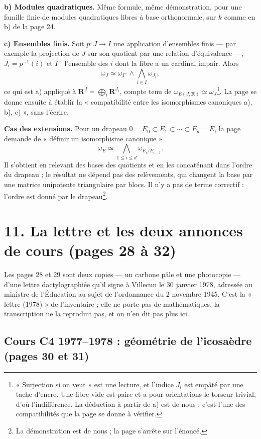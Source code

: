 \documentclass[11pt,a4paper]{article}
\begin{document}
\textbf{b) Modules quadratiques.} Même formule, même démonstration, pour une
famille finie de modules quadratiques libres à base orthonormale, sur $k$
comme en b) de la page 24.

\textbf{c) Ensembles finis.} Soit $p : J \to I$ une application d'ensembles
finis --- par exemple la projection de $J$ sur son quotient par une relation
d'équivalence ---, $J_i = p^{-1}(i)$ et $I^{-}$ l'ensemble des $i$ dont la
fibre a un cardinal impair. Alors
\[
  \omega_J \simeq \omega_{I^{-}} \wedge \bigwedge_{i \in I} \omega_{J_i},
\]
ce qui est a) appliqué à $\mathbf{R}^J = \bigoplus_i \mathbf{R}^{J_i}$, compte
tenu de $\omega_{E(J, \mathbf{R})} \simeq \omega_J$\footnote{« Surjection si
on veut » est une lecture, et l'indice $J_i$ est empâté par une tache
d'encre. Une fibre vide est paire et a pour orientations le torseur trivial,
d'où l'indifférence. La déduction à partir de a) est de nous ; c'est l'une
des compatibilités que la page se donne à vérifier.}. La page se donne
ensuite à établir la « compatibilité entre les isomorphismes canoniques a),
b), c) », sans l'écrire.

\textbf{Cas des extensions.} Pour un drapeau $0 = E_0 \subset E_1 \subset
\cdots \subset E_d = E$, la page demande de « définir un isomorphisme
canonique »
\[
  \omega_E \simeq \bigwedge_{1 \leq i \leq d} \omega_{E_i/E_{i-1}} .
\]
Il s'obtient en relevant des bases des quotients et en les concaténant dans
l'ordre du drapeau ; le résultat ne dépend pas des relèvements, qui changent
la base par une matrice unipotente triangulaire par blocs. Il n'y a pas de
terme correctif : l'ordre est donné par le drapeau\footnote{La démonstration
est de nous ; la page s'arrête sur l'énoncé.}.

\section*{11. La lettre et les deux annonces de cours (pages 28 à 32)}

Les pages 28 et 29 sont deux copies --- un carbone pâle et une photocopie ---
d'une lettre dactylographiée qu'il signe à Villecun le 30 janvier 1978, adressée
au ministre de l'Éducation au sujet de l'ordonnance du 2 novembre 1945. C'est la
« lettre (1978) » de l'inventaire ; elle ne porte pas de mathématiques, la
transcription ne la reproduit pas, et on n'en dit pas plus ici.

\subsection*{Cours C4 1977--1978 : géométrie de l'icosaèdre (pages 30 et 31)}
\end{document}
